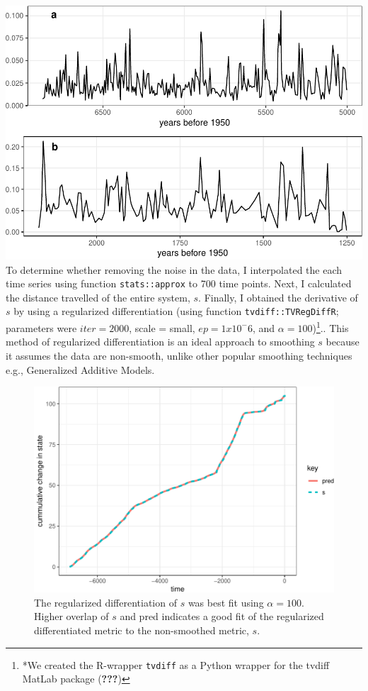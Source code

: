 \documentclass[12pt,twoside,openany]{reedthesis}
\begin{document}
\includegraphics{_myDissertation_files/figure-latex/paleoRegime1and3-1.pdf}
To determine whether removing the noise in the data, I interpolated the each time series using function \texttt{stats::approx} to 700 time points. Next, I calculated the distance travelled of the entire system, \(s\). Finally, I obtained the derivative of \(s\) by using a regularized differentiation (using function \texttt{tvdiff::TVRegDiffR}; parameters were \(iter = 2000\), scale = small, \(ep = 1 x 10^-6\), and \(\alpha = 100\))\footnote{*We created the R-wrapper \texttt{tvdiff} as a Python wrapper for the tvdiff MatLab package ({\textbf{???}})}.. This method of regularized differentiation is an ideal approach to smoothing \(s\) because it assumes the data are non-smooth, unlike other popular smoothing techniques e.g., Generalized Additive Models.
\begin{figure}
\centering
\includegraphics{_myDissertation_files/figure-latex/paleoObsPred-1.pdf}
\caption{\label{fig:paleoObsPred}The regularized differentiation of \(s\) was best fit using \(\alpha = 100\). Higher overlap of \(s\) and pred indicates a good fit of the regularized differentiated metric to the non-smoothed metric, \(s\).}
\end{figure}
\end{document}
